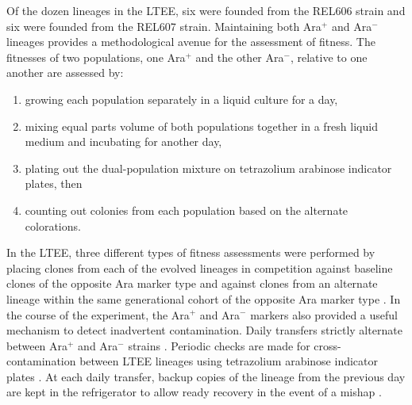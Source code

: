 Of the dozen lineages in the LTEE, six were founded from the REL606 strain and six were founded from the REL607 strain.
Maintaining both Ara$^+$ and Ara$^-$ lineages provides a methodological avenue for the assessment of fitness.
The fitnesses of two populations, one Ara$^+$ and the other Ara$^-$, relative to one another are assessed by:
\begin{enumerate}
\item growing each population separately in a liquid culture for a day,
\item mixing equal parts volume of both populations together in a fresh liquid medium and incubating for another day,
\item plating out the dual-population mixture on tetrazolium arabinose indicator plates, then
\item counting out colonies from each population based on the alternate colorations.
\end{enumerate} 
In the LTEE, three different types of fitness assessments were performed by placing clones from each of the evolved lineages in competition against baseline clones of the opposite Ara marker type and against clones from an alternate lineage within the same generational cohort of the opposite Ara marker type
\cite{Lenski1991Long-TermGenerations}.
In the course of the experiment, the Ara$^+$ and Ara$^-$ markers also provided a useful mechanism to detect inadvertent contamination.
Daily transfers strictly alternate between Ara$^+$ and Ara$^-$ strains \cite{Lenski2017TheSite}.
Periodic checks are made for cross-contamination between LTEE lineages using tetrazolium arabinose indicator plates \cite{Lenski1991Long-TermGenerations}.
At each daily transfer, backup copies of the lineage from the previous day are kept in the refrigerator to allow ready recovery in the event of a mishap \cite{Lenski2017TheSite}.


